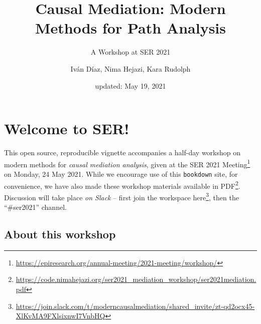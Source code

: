 \documentclass[
  12pt,
]{book}
\title{Causal Mediation: Modern Methods for Path Analysis}
\subtitle{A Workshop at SER 2021}
\author{Iván Díaz, Nima Hejazi, Kara Rudolph}
\date{updated: May 19, 2021}
\newcommand{\passthrough}[1]{#1}
\renewcommand{\href}[2]{#2\footnote{\url{#1}}}
\theoremstyle{definition}
\theoremstyle{definition}
\theoremstyle{definition}
\newcommand{\1}{\mathbbm{1}}
\begin{document}
\maketitle


\thispagestyle{empty}

\begin{center}
\end{center}

\setlength{\abovedisplayskip}{-5pt}
\setlength{\abovedisplayshortskip}{-5pt}

\mainmatter

{
\hypersetup{linkcolor=}
\setcounter{tocdepth}{2}
\tableofcontents
}
\hypertarget{welcome-to-ser}{%
\chapter*{Welcome to SER!}\label{welcome-to-ser}}


This open source, reproducible vignette accompanies a half-day workshop on
modern methods for \emph{causal mediation analysis}, given at the \href{https://epiresearch.org/annual-meeting/2021-meeting/workshop/}{SER 2021
Meeting} on
Monday, 24 May 2021. While we encourage use of this \passthrough{\lstinline!bookdown!} site, for
convenience, we have also made these workshop materials \href{https://code.nimahejazi.org/ser2021_mediation_workshop/ser2021mediation.pdf}{available in
PDF}.
Discussion will take place \emph{on Slack} -- first join the workspace
\href{https://join.slack.com/t/moderncausalmediation/shared_invite/zt-qd2ocx45-XlKvMA9FXlsixnwI7VnbHQ}{here},
then the ``\#ser2021'' channel.

\hypertarget{about}{%
\section{About this workshop}\label{about}}
\end{document}
